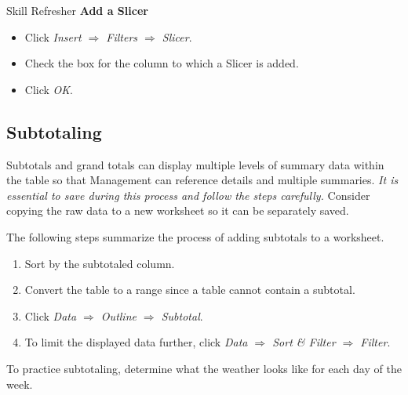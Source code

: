 \begin{center}
	\begin{sklbox}{Skill Refresher}
		\textbf{Add a Slicer}
		\\
		\begin{itemize}
			\setlength{\itemsep}{0pt}
			\setlength{\parskip}{0pt}
			\setlength{\parsep}{0pt}

			\item Click \textit{Insert $ \Rightarrow $ Filters $ \Rightarrow $ Slicer}.
			\item Check the box for the column to which a Slicer is added.
			\item Click \textit{OK}.
			
		\end{itemize}
	\end{sklbox}
\end{center}

\subsection{Subtotaling}

Subtotals and grand totals can display multiple levels of summary data within the table so that Management can reference details and multiple summaries. \textit{It is essential to save during this process and follow the steps carefully.} Consider copying the raw data to a new worksheet so it can be separately saved.

The following steps summarize the process of adding subtotals to a worksheet.

\begin{enumbox}
	\begin{enumerate}
		\item Sort by the subtotaled column.
		\item Convert the table to a range since a table cannot contain a subtotal.
		\item Click \textit{Data $ \Rightarrow $ Outline $ \Rightarrow $ Subtotal}.
		\item To limit the displayed data further, click \textit{Data $ \Rightarrow $ Sort \& Filter $ \Rightarrow $ Filter}.
	\end{enumerate}
\end{enumbox}
	
To practice subtotaling, determine what the weather looks like for each day of the week.


